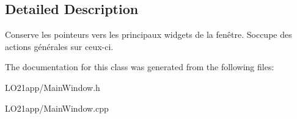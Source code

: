 \subsection{Detailed Description}
Conserve les pointeurs vers les principaux widgets de la fenêtre. S\textquotesingle{}occupe des actions générales sur ceux-\/ci. 

The documentation for this class was generated from the following files\+:\begin{DoxyCompactItemize}
\item 
L\+O21app/Main\+Window.\+h\item 
L\+O21app/Main\+Window.\+cpp\end{DoxyCompactItemize}
